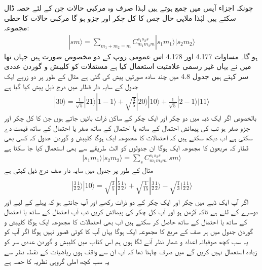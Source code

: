  چونکہ  اجزاء آپس میں جمع ہوتے ہیں لہذا صرف وہ مرکبی حالات جن کے لئے 
حصہ ڈال سکتے ہیں لہٰذا ملاپی حال 
جس کا کل چکر  اور  جزو   ہو گا مرکبی حالات  کا خطی مجموعہ:
\begin{align}
|sm\rangle=\sum_{m_1+m_2=m}C_{m_1m_2m}^{s_1s_2s} |s_1m_1\rangle |s_2 m_2\rangle
\end{align}
ہو گا۔ مساوات 4.177 اور 4.178 اس عمومی روپ کے دو مخصوص صورت ہیں جہاں  تھا میں نے یہاں غیر رسمی علامتیت   استعمال کیا ہے مستقلات  کو كليبش و گوردن عددی سر کہتے ہیں جدول 4.8 میں چند سادہ صورتیں پیش کی گئی ہے مثال کے طور پر دو زربے ایک جدول کے سایہ دار قطار میں درج ذیل پیش کیا گیا ہے 
\begin{align*}
| 3 0 \rangle = \frac{1}{\sqrt{5}} | 2 1 \rangle | 1 - 1 \rangle + \sqrt{\frac{3}{5}} | 2 0 \rangle | 1 0 \rangle + \frac{1}{\sqrt{5}} | 2 - 1 \rangle | 1 1 \rangle
\end{align*}
بالخصوص اگر ایک ڈبہ میں دو چکر اور ایک چکر کے ساکن ذرات بائیں جاتے ہوں جن کا کل چکر  اور  جزو صفر ہو تب  کی پیمائش  احتمال کے ساتھ  یا  احتمال کے ساتھ صفر یا  احتمال کے ساتھ  قیمت دے سکتی ہے اب دیکھ سکتے ہیں کہ احتمالات کا مجموعہ ایک ہوگا كليبش و گوردن جدول کہ کسی بھی قطار کہ مربعون کا مجموعہ ایک ہوگا ان جدولوں کو الٹ طریقے سے بھی استعمال کیا جا سکتا ہے 
\begin{align} 
| s_1 m_1 \rangle | s_2 m_2 \rangle = \sum_s C_{m_1 m_2 m}^{s_1 s_2 s} | s m \rangle
\end{align}
مثال کے طور پر  جدول میں سایہ دار صف درج ذیل کہتی ہے 
\begin{align*}
| \frac{3}{2} \frac{1}{2} \rangle | 1 0 \rangle = \sqrt{\frac{3}{5}} | \frac{5}{2} \frac{1}{2} \rangle + \sqrt{\frac{1}{15}} | \frac{3}{2} \frac{1}{2} \rangle - \sqrt{\frac{1}{3}} | \frac{1}{2} \frac{1}{2} \rangle
\end{align*}
اگر آپ ایک ڈبے میں  چکر اور ایک چکر کے دو ذرات رکھے اور آپ جانتے ہو کہ پہلے کے لیے  اور دوسرے کے لئے  ہے تاکہ  لازمن  ہو اور آپ کل چکر  کی پیمائش کریں تب آپ  احتمال کے ساتھ  یا  احتمال کے ساتھ  یا  احتمال کے ساتھ  حاصل کر سکتے ہیں اب بھی احتمالات کا مجموعہ ایک ہوگا كليبش و گوردن جدول میں ہر صف کے مربع کا مجموعہ ایک ہوگا یہاں آپ کا کوئی قصور نہیں ہوگا اگر آپ کو یہ سب کچھ صوفیانہ اعداد و شمار نظر آنے لگا ہوں ہم اس کتاب میں كليبش و گوردن عددی سر کو زیادہ استعمال نہیں کریں گے میں صرف چاہتا تھا کہ آپ ان سے واقف ہوں ریاضیات کے نقطہ نظر سے یہ سب کچھ املی گروہی نظریہ کا حصہ ہے 
